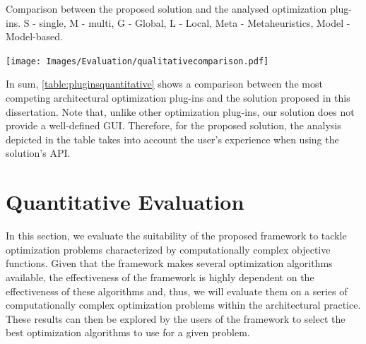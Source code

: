 \begin{table}[htbp]		
	\centering
	\caption[Comparison between the proposed solution and the analysed optimization plug-ins]{Comparison between the proposed solution and the analysed optimization plug-ins. S - single, M - multi, G - Global, L - Local, Meta - Metaheuristics, Model - Model-based.}
	\label{table:pluginsquantitative}
	\texttt{[image: Images/Evaluation/qualitativecomparison.pdf]}
\end{table}

In sum, \cref{table:pluginsquantitative} shows a comparison between the most competing architectural optimization plug-ins and the solution proposed in this dissertation. Note that, unlike other optimization plug-ins, our solution does not provide a well-defined \ac{GUI}. Therefore, for the proposed solution, the analysis depicted in the table takes into account the user's experience when using the solution's \ac{API}.

\section{Quantitative Evaluation}
\label{sec:quantitative}

In this section, we evaluate the suitability of the proposed framework to tackle optimization problems characterized by computationally complex objective functions. Given that the framework makes several optimization algorithms available, the effectiveness of the framework is highly dependent on the effectiveness of these algorithms and, thus, we will evaluate them on a series of computationally complex optimization problems within the architectural practice. These results can then be explored by the users of the framework to select the best optimization algorithms to use for a given problem.


